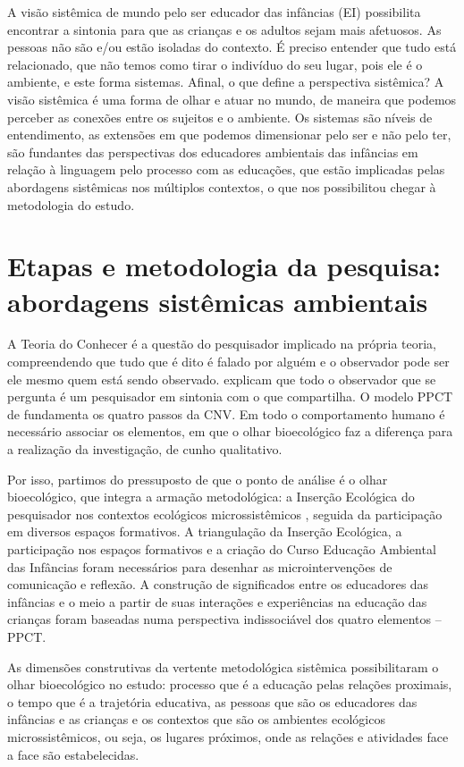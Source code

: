 \documentclass{textolivre}
\begin{document}
A visão sistêmica de mundo pelo ser educador das infâncias (EI) possibilita encontrar a sintonia para que as crianças e os adultos sejam mais afetuosos. As pessoas não são e/ou estão isoladas do contexto. É preciso entender que tudo está relacionado, que não temos como tirar o indivíduo do seu lugar, pois ele é o ambiente, e este forma sistemas. Afinal, o que define a perspectiva sistêmica? A visão sistêmica é uma forma de olhar e atuar no mundo, de maneira que podemos perceber as conexões entre os sujeitos e o ambiente. Os sistemas são níveis de entendimento, as extensões em que podemos dimensionar pelo ser e não pelo ter, são fundantes das perspectivas dos educadores ambientais das infâncias em relação à linguagem pelo processo com as educações, que estão implicadas pelas abordagens sistêmicas nos múltiplos contextos, o que nos possibilitou chegar à metodologia do estudo.



\section{Etapas e metodologia da pesquisa: abordagens sistêmicas ambientais}\label{sec-etapas}
A Teoria do Conhecer é a questão do pesquisador implicado na própria teoria, compreendendo que tudo que é dito é falado por alguém e o observador pode ser ele mesmo quem está sendo observado. \textcite{maturana2011} explicam que todo o observador que se pergunta é um pesquisador em sintonia com o que compartilha. O modelo PPCT de \textcite{brofen2011} fundamenta os quatro passos da CNV. Em todo o comportamento humano é necessário associar os elementos, em que o olhar bioecológico faz a diferença para a realização da investigação, de cunho qualitativo. 

Por isso, partimos do pressuposto de que o ponto de análise é o olhar bioecológico, que integra a armação metodológica: a Inserção Ecológica do pesquisador nos contextos ecológicos microssistêmicos \cite{piske2018c,koller2016,silveira2009}, seguida da participação em diversos espaços formativos. A triangulação da Inserção Ecológica, a participação nos espaços formativos e a criação do Curso Educação Ambiental das Infâncias foram necessários para desenhar as microintervenções de comunicação e reflexão. A construção de significados entre os educadores das infâncias e o meio a partir de suas interações e experiências na educação das crianças foram baseadas numa perspectiva indissociável dos quatro elementos – PPCT. 

As dimensões construtivas da vertente metodológica sistêmica possibilitaram o olhar bioecológico no estudo: processo que é a educação pelas relações proximais, o tempo que é a trajetória educativa, as pessoas que são os educadores das infâncias e as crianças e os contextos que são os ambientes ecológicos microssistêmicos, ou seja, os lugares próximos, onde as relações e atividades face a face são estabelecidas.  
\end{document}

